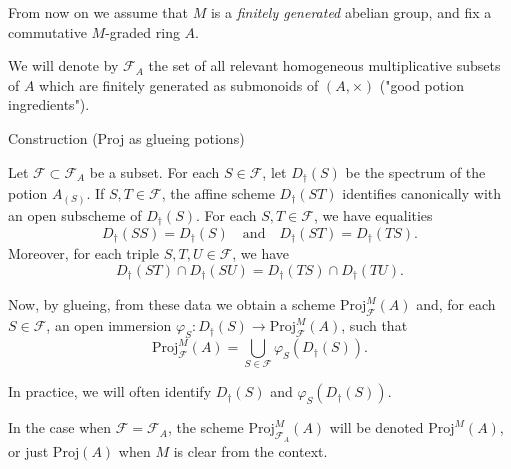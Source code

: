 \documentclass[9pt]{beamer}
\begin{document}
\begin{frame}


From now on we assume that $M$ is a \emph{finitely generated} abelian group, and fix a commutative $M$-graded ring $A$.

We will denote by $\mathcal{F}_A$ the set of all relevant homogeneous multiplicative subsets of $A$ which are finitely generated as submonoids of $(A,\times)$ ("good potion ingredients").

\begin{block}{Construction (Proj as glueing potions)}

Let
$\mathcal{F} \subset \mathcal{F}_A$ be a subset.
 For each $S \in \mathcal{F}$, let $D_{\dagger}(S)$ be the spectrum of the potion $A_{(S)}$. 
 If $S,T \in \mathcal{F}$, the affine scheme $D_{\dagger}(ST)$ identifies canonically with an open subscheme of $D_{\dagger}(S)$. For each $S,T \in \mathcal{F}$, we have equalities
 \[
 D_{\dagger}({S S}) = D_{\dagger}(S) \quad \text{and} \quad D_{\dagger}({ST})=D_{\dagger}({TS}).
 \]
 Moreover, for each triple $S,T,U \in \mathcal{F}$, we have
 \[
 D_{\dagger}({ST} )\cap D_{\dagger}({SU}) = D_{\dagger}({TS}) \cap D_{\dagger}({TU}).
 \]

Now, by glueing, from these data we obtain a scheme $\mathrm{Proj}^M_{\mathcal{F} } (A)$ and, for each $S \in \mathcal{F}$, an open immersion $\varphi_S : D_{\dagger}(S) \to \mathrm{Proj}^M_{\mathcal{F}} (A)$, such that
\[
\mathrm{Proj}^M_{\mathcal{F} } (A) = \bigcup_{S \in \mathcal{F} } \varphi_S( D_{\dagger}(S)).
\]

In practice, we will often identify $D_{\dagger}(S) $ and $\varphi_S (D_{\dagger}(S))$. 


In the case when $\mathcal{F} = \mathcal{F}_A$,
 the scheme $\mathrm{Proj}^M_{\mathcal{F}_A} (A)$ will be denoted $\mathrm{Proj}^M(A)$, or just $\mathrm{Proj}( A)$ when $M$ is clear from the context.
 \end{block}

 \end{frame}
\end{document}
